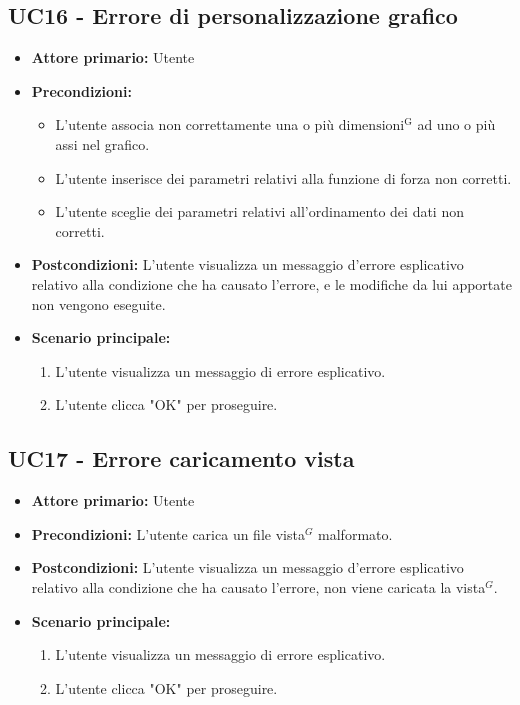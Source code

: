 \subsection{UC16 - Errore di personalizzazione grafico}
\label{sec:UC16 - Errore di personalizzazione}
\begin{itemize}
    \item \textbf{Attore primario:} Utente
    \item \textbf{Precondizioni:}
    		\begin{itemize}
    			\item L'utente associa non correttamente una o più ${\mathrm{dimensioni^{G}}}$ ad uno o più assi nel grafico.
    			\item L'utente inserisce dei parametri relativi alla funzione di forza non corretti.
    			\item L'utente sceglie dei parametri relativi all'ordinamento dei dati non corretti.
    		\end{itemize}
    \item \textbf{Postcondizioni:} L'utente visualizza un messaggio d'errore esplicativo relativo alla condizione che ha causato l'errore, e le modifiche da lui apportate non vengono eseguite.
    \item \textbf{Scenario principale:}
    \begin{enumerate}
        \item L'utente visualizza un messaggio di errore esplicativo.
        \item L'utente clicca "OK" per proseguire.
    \end{enumerate}
\end{itemize}

\subsection{UC17 - Errore caricamento vista}
\label{sec:UC17 - Errore caricamento vista}
\begin{itemize}
    \item \textbf{Attore primario:} Utente
    \item \textbf{Precondizioni:} L'utente carica un file vista$^{G}$ malformato.
    \item \textbf{Postcondizioni:} L'utente visualizza un messaggio d'errore esplicativo relativo alla condizione che ha causato l'errore, non viene caricata la vista$^{G}$.
    \item \textbf{Scenario principale:}
    \begin{enumerate}
        \item L'utente visualizza un messaggio di errore esplicativo.
        \item L'utente clicca "OK" per proseguire.
    \end{enumerate}
\end{itemize}

